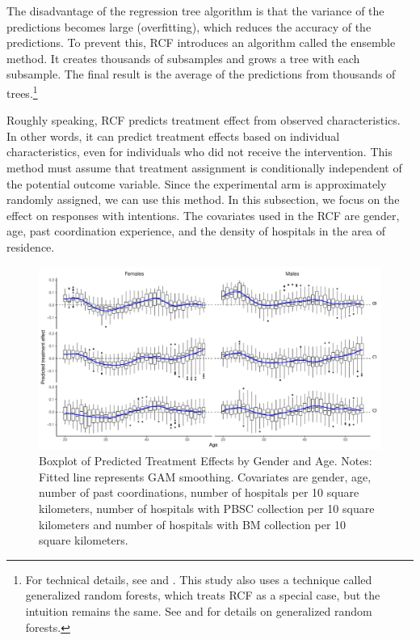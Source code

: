 \documentclass[
]{article}
\begin{document}
The disadvantage of the regression tree algorithm is that the variance of the predictions becomes large (overfitting), which reduces the accuracy of the predictions. To prevent this, RCF introduces an algorithm called the ensemble method. It creates thousands of subsamples and grows a tree with each subsample. The final result is the average of the predictions from thousands of trees.\footnote{For technical details, see \citet{Athey2016} and \citet{Wager2018}. This study also uses a technique called generalized random forests, which treats RCF as a special case, but the intuition remains the same. See \citet{Athey2019} and \citet{Athey2019a} for details on generalized random forests.}

Roughly speaking, RCF predicts treatment effect from observed characteristics. In other words, it can predict treatment effects based on individual characteristics, even for individuals who did not receive the intervention. This method must assume that treatment assignment is conditionally independent of the potential outcome variable. Since the experimental arm is approximately randomly assigned, we can use this method. In this subsection, we focus on the effect on responses with intentions. The covariates used in the RCF are gender, age, past coordination experience, and the density of hospitals in the area of residence.

\begin{figure}[t]
\includegraphics{robustness-body_files/figure-latex/boxplot-rcf-int-1} \caption{Boxplot of Predicted Treatment Effects by Gender and Age. Notes: Fitted line represents GAM smoothing. Covariates are gender, age, number of past coordinations, number of hospitals per 10 square kilometers, number of hospitals with PBSC collection per 10 square kilometers and number of hospitals with BM collection per 10 square kilometers.}\label{fig:boxplot-rcf-int}
\end{figure}
\end{document}
